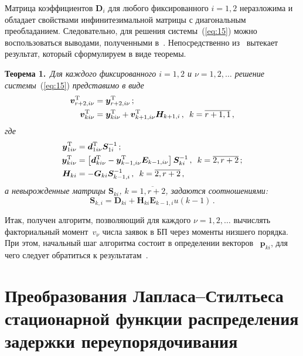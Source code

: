 \begin{multicols}{2}
Матрица коэффициентов $\boldsymbol{D}_{i}$ для любого фиксированного $i=1,2$ неразложима 
и обладает  свойствами инфинитезимальной  матрицы с диагональным преобладанием. Следовательно, 
для решения системы~(\ref{eq:15}) можно воспользоваться выводами, полученными в~\cite{3mat}. 
Непосредственно из~\cite{3mat} вытекает  результат, который сформулируем в виде теоремы.

\medskip

\noindent
\textbf{Теорема 1.}\ \textit{Для каждого фиксированного $i=1,2$ и $\nu=1,2,\ldots$ решение системы}~(\ref{eq:15}) 
\textit{представимо в виде}
\begin{align*}
\boldsymbol{v}_{r+2,i\nu}^{\mathrm{T}}&=\boldsymbol{y}_{r+2,i\nu}^{\mathrm{T}}\,;\\
\boldsymbol{v}_{ki\nu}^{\mathrm{T}}&=\boldsymbol{y}_{ki\nu}^{\mathrm{T}}+
\boldsymbol{v}_{k+1,i\nu}^{\mathrm{T}}\boldsymbol{H}_{k+1,i}\,,\enskip k=\overline{r+1,1}\,,
\end{align*}
\textit{где}
\begin{align*}
\boldsymbol{y}_{1i\nu}^{\mathrm{T}}&=\boldsymbol{d}_{1i\nu}^{\mathrm{T}}\boldsymbol{S}_{1i}^{-1}\,;
\\
\boldsymbol{y}_{ki\nu}^{\mathrm{T}}&=\left[\boldsymbol{d}_{ki\nu}^{\mathrm{T}}-
\boldsymbol{y}_{k-1,i\nu}^{\mathrm{T}}\boldsymbol{E}_{k-1,i\nu}\right]
\boldsymbol{S}_{ki}^{-1}\,,\enskip k=\overline{2,r+2}\,;
\\
\boldsymbol{H}_{ki}&=-\boldsymbol{G}_{ki}\boldsymbol{S}_{k-1,i}^{-1}\,,\enskip k=\overline{2,r+2}\,,
\end{align*}
\textit{а невырожденные матрицы $\boldsymbol{S}_{ki}$, $k=\overline{1,r+2}$, задаются соотношениями:}
\begin{equation*}
\boldsymbol{S}_{k,i}=\boldsymbol{D}_{ki}+\boldsymbol{H}_{ki}
\boldsymbol{E}_{k-1,i}u(k-1)\,.
\end{equation*}


\smallskip

Итак, получен алгоритм, позволяющий для каж\-до\-го $\nu=1,2,\ldots$ вычислять факториальный момент~$v_{\nu}$ 
числа заявок в БП через моменты низшего порядка. При этом, начальный шаг алгоритма состоит в определении 
векторов~ $\boldsymbol{p}_{ki}$, для чего следует обратиться к результатам~\cite{2mat}.


\section{Преобразования Лапласа--Стилтьеса стационарной функции распределения задержки переупорядочивания}


\end{multicols}
